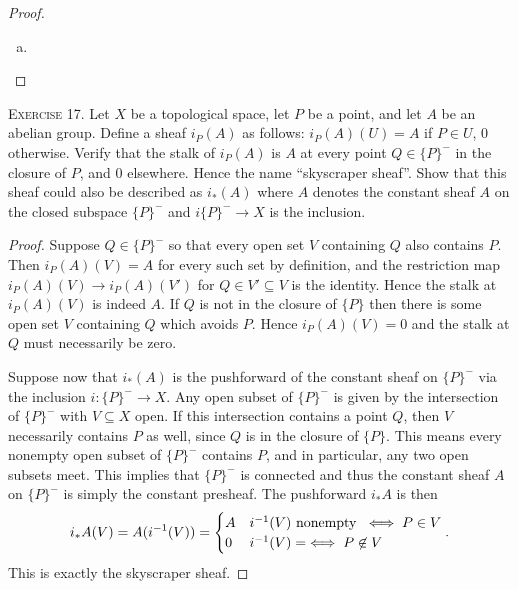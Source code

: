 \begin{problemset}
\begin{proof}
\begin{enumerate}[(a)]
			\item 
		\end{enumerate}
	\end{proof}
	\item[\textsc{Exercise 17.}] Let $X$ be a topological space, let $P$ be a point, and let $A$ be an abelian group. Define a sheaf $i_P(A)$ as follows: $i_P(A)(U) = A$ if $P\in U$, $0$ otherwise. Verify that the stalk of $i_P(A)$ is $A$ at every point $Q\in \{P\}^-$ in the closure of $P$, and $0$ elsewhere. Hence the name ``skyscraper sheaf''. Show that this sheaf could also be described as $i_*(A)$ where $A$ denotes the constant sheaf $A$ on the closed subspace $\{P\}^-$ and $i\{P\}^-\to X$ is the inclusion.
	\begin{proof}
		Suppose $Q\in \{P\}^-$ so that every open set $V$ containing $Q$ also contains $P$. Then $i_P(A)(V) = A$ for every such set by definition, and the restriction map $i_P(A)(V) \to i_P(A)(V')$ for $Q \in V' \subseteq V$ is the identity. Hence the stalk at $i_P(A)(V)$ is indeed $A$. If $Q$ is not in the closure of $\{P\}$ then there is some open set $V$ containing $Q$ which avoids $P$. Hence $i_P(A)(V) = 0$ and the stalk at $Q$ must necessarily be zero.

		Suppose now that $i_*(A)$ is the pushforward of the constant sheaf on $\{P\}^-$ via the inclusion $i:\{P\}^-\to X$. Any open subset of $\{P\}^-$ is given by the intersection of $\{P\}^-$ with $V\subseteq X$ open. If this intersection contains a point $Q$, then $V$ necessarily contains $P$ as well, since $Q$ is in the closure of $\{P\}$. This means every nonempty open subset of $\{P\}^-$ contains $P$, and in particular, any two open subsets meet. This implies that $\{P\}^-$ is connected and thus the constant sheaf $A$ on $\{P\}^-$ is simply the constant presheaf. The pushforward $i_*A$ is then
		\begin{align*}
			i_*A(V) = A(i^{-1}(V)) =
			\begin{cases}
				A & i^{-1}(V) \text{ nonempty } \iff P\in V\\
				0 & i^{-1}(V) = \empty \iff P\not\in V
			\end{cases}.
		\end{align*}
		This is exactly the skyscraper sheaf.
	\end{proof}
\end{problemset}

